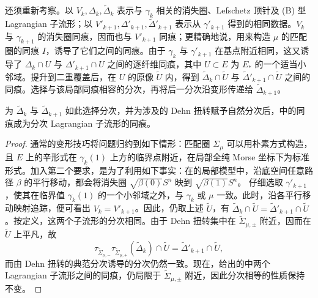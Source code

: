 还须重新考察。以 $V_k,\Delta_k,\widetilde\Delta_k$ 表示与 $\gamma_k$ 相关的消失圈、Lefschetz 顶针及 (B) 型 Lagrangian 子流形；以 $V'_{k+1},\Delta'_{k+1},\widetilde\Delta'_{k+1}$ 表示从 $\gamma'_{k+1}$ 得到的相同数据。$V_k$ 与 $\gamma_{k+1}$ 的消失圈同痕，因而也与 $V'_{k+1}$ 同痕；更精确地说，用来构造 $\mu$ 的匹配圈的同痕 $I$，诱导了它们之间的同痕。由于 $\gamma_k$ 与 $\gamma'_{k+1}$ 在基点附近相同，这又诱导了 $\Delta_k\cap U$ 与 $\Delta'_{k+1}\cap U$ 之间的逐纤维同痕，其中 $U\subset E$ 为 $E_*$ 的一个适当小邻域。提升到二重覆盖后，在 $U$ 的原像 $\widetilde U$ 内，得到 $\widetilde\Delta_k\cap\widetilde U$ 与 $\widetilde\Delta'_{k+1}\cap\widetilde U$ 之间的同痕。选择与该局部同痕相容的分次，再将后一分次沿变形传递给 $\widetilde\Delta_{k+1}$。
\begin{lemma}\label{st:18.7}
为 $\widetilde\Delta_k$ 与 $\widetilde\Delta_{k+1}$ 如此选择分次，并为涉及的 Dehn 扭转赋予自然分次后，中的同痕成为分次 Lagrangian 子流形的同痕。
\end{lemma}
\begin{proof}
通常的变形技巧将问题归约到如下情形：匹配圈 $\Sigma_\mu$ 可以用朴素方式构造，且 $E$ 上的辛形式在 $\gamma_k(1)$ 上方的临界点附近，在局部全纯 Morse 坐标下为标准形式。加入第二个要求，是为了利用如下事实：在的局部模型中，沿底空间任意路径 $\beta$ 的平行移动，都会将消失圈 $\sqrt{\beta(0)}S^n$ 映到 $\sqrt{\beta(1)}S^n$。
仔细选取 $\gamma'_{k+1}$，使其在临界值 $\gamma_k(1)$ 的一个小邻域之外，与 $\gamma_k$ 或 $\mu$ 一致。此时，沿各平行移动映射追踪，便可看出 $V_k=V'_{k+1}$。因此，仍取上述 $\widetilde U$，有 $\widetilde\Delta_k\cap\widetilde U=\widetilde\Delta'_{k+1}\cap\widetilde U$。按定义，这两个子流形的分次相同。由于 Dehn 扭转集中在 $\widetilde\Sigma_{\mu,\pm}$ 附近，因而在 $\widetilde U$ 上平凡，故
\begin{equation}\label{eq:18.17}
\tau_{\widetilde\Sigma_{\mu,-}}\tau_{\widetilde\Sigma_{\mu,+}}(\widetilde\Delta_k)\cap\widetilde U
=\widetilde\Delta'_{k+1}\cap\widetilde U,
\end{equation}
而由 Dehn 扭转的典范分次诱导的分次仍然一致。现在，给出的中两个 Lagrangian 子流形之间的同痕，仍局限于 $\widetilde\Sigma_{\mu,\pm}$ 附近，因此分次相等的性质保持不变。
\end{proof}
